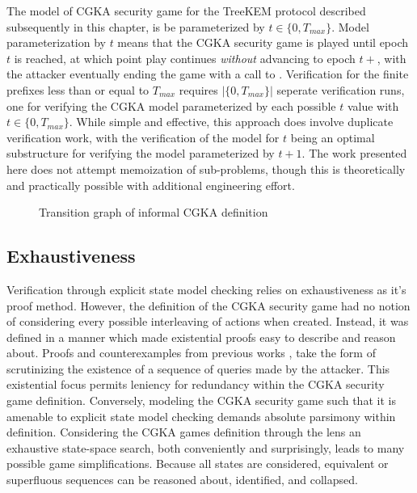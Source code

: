 The model of CGKA security game for the TreeKEM protocol described subsequently in this chapter, is be parameterized by $t \in \{ 0, T_{max} \}$.
Model parameterization by $t$ means that the CGKA security game is played until epoch $t$ is reached, at which point play continues \emph{without} advancing to epoch $t+$, with the attacker eventually ending the game with a call to .
Verification for the finite \CGKAsec prefixes less than or equal to \(T_{max}\) requires $|\{ 0, T_{max} \}|$ seperate verification runs, one for verifying the CGKA model parameterized by each possible $t$ value with $t \in \{ 0, T_{max} \}$.
While simple and effective, this approach does involve duplicate verification work, with the verification of the model for $t$ being an optimal substructure for verifying the model parameterized by $t+1$.
The work presented here does not attempt memoization of sub-problems, though this is theoretically and practically possible with additional engineering effort.

\begin{figure}
  \centering
  \caption{\label{fig:CGKA-informal}Transition graph of informal CGKA definition}
\end{figure}



\hypertarget{exhaustiveness}{%
\subsection{Exhaustiveness}\label{exhaustiveness}}

Verification through explicit state model checking relies on exhaustiveness as it's proof method.
However, the definition of the CGKA security game had no notion of considering every possible interleaving of actions when created.
Instead, it was defined in a manner which made existential proofs easy to describe and reason about.
Proofs and counterexamples from previous works \autocite{alwen2019double}, \autocite{alwen2020security} take the form of scrutinizing the existence of a sequence of queries made by the attacker.
This existential focus permits leniency for redundancy within the CGKA security game definition.
Conversely, modeling the CGKA security game such that it is amenable to explicit state model checking demands absolute parsimony within definition.
Considering the CGKA games definition through the lens an exhaustive state-space search, both conveniently and surprisingly, leads to many possible game simplifications.
Because all states are considered, equivalent or superfluous sequences can be reasoned about, identified, and collapsed.

